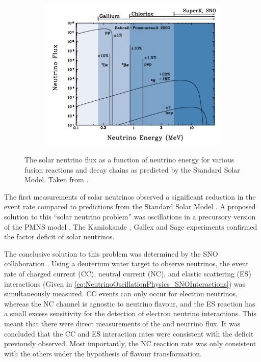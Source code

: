 \begin{figure}[h]
  \begin{subfigure}[t]{0.80\textwidth}
    \includegraphics[width=\textwidth, trim={0mm 0mm 0mm 0mm}, clip,page=1]{Figures/Theory/SolarNeutrinoFlux.pdf}
  \end{subfigure}
  \caption{The solar neutrino flux as a function of neutrino energy for various fusion reactions and decay chains as predicted by the Standard Solar Model. Taken from \cite{Bellerive2004-ur}.}
  \label{fig:NeutrinoOscillationPhysics_SolarNeutrinoFlux}
\end{figure}

The first measurements of solar neutrinos observed a significant reduction in the event rate compared to predictions from the Standard Solar Model \cite{PhysRevLett.20.1205, Vinyoles2017-vv}. A proposed solution to this ``solar neutrino problem'' was  oscillations in a precursory version of the PMNS model \cite{Gribov1969-xi}. The Kamiokande \cite{PhysRevLett.63.16}, Gallex \cite{Hampel1999-of} and Sage \cite{PhysRevC.60.055801} experiments confirmed the  factor deficit of solar neutrinos.

The conclusive solution to this problem was determined by the SNO collaboration \cite{Ahmad2002-zv}. Using a deuterium water target to observe  neutrinos, the event rate of charged current (CC), neutral current (NC), and elastic scattering (ES) interactions (Given in \autoref{eq:NeutrinoOscillationPhysics_SNOInteractions}) was simultaneously measured. CC events can only occur for electron neutrinos, whereas the NC channel is agnostic to neutrino flavour, and the ES reaction has a small excess sensitivity for the detection of electron neutrino interactions. This meant that there were direct measurements of the  and  neutrino flux. It was concluded that the CC and ES interaction rates were consistent with the deficit previously observed. Most importantly, the NC reaction rate was only consistent with the others under the hypothesis of flavour transformation.

